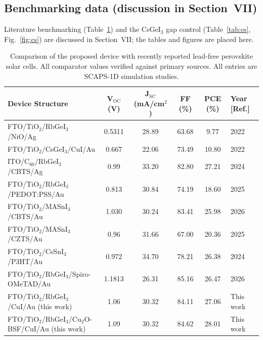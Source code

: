\documentclass[aip,amsmath,amssymb,preprint]{revtex4-2}
\begin{document}
\subsection{Benchmarking data (discussion in Section~VII)}
Literature benchmarking (Table~\ref{tab:bench}) and the CsGeI$_{3}$ gap control (Table~\ref{tab:cs}, Fig.~\ref{fig:cs}) are discussed in Section~VII; the tables and figures are placed here.

\begin{table}[htbp]
\label{tab:bench}
\centering
{\scriptsize\setlength{\tabcolsep}{2pt}
\begin{tabular*}{\textwidth}{@{\extracolsep{\fill}}lccccl}
\hline
Device Structure & V$_{\mathrm{OC}}$ (V) & J$_{\mathrm{SC}}$ (mA/cm$^{2}$) & FF (\%) & PCE (\%) & Year [Ref.]
\\\hline
FTO/\allowbreak{}TiO$_{2}$/RbGeI$_{3}$/NiO/\allowbreak{}Ag & 0.5311 & 28.89 & 63.68 & 9.77 & 2022 \cite{r14}\\
FTO/\allowbreak{}TiO$_{2}$/CsGeI$_{3}$/CuI/\allowbreak{}Au & 0.667 & 22.06 & 73.49 & 10.80 & 2022 \cite{r24}\\
ITO/\allowbreak{}C$_{60}$/RbGeI$_{3}$/CBTS/\allowbreak{}Ag & 0.99 & 33.20 & 82.80 & 27.21 & 2024 \cite{r22}\\
FTO/\allowbreak{}TiO$_{2}$/RbGeI$_{3}$/PEDOT:PSS/\allowbreak{}Au & 0.813 & 30.84 & 74.19 & 18.60 & 2025 \cite{r39}\\
FTO/\allowbreak{}TiO$_{2}$/MASnI$_{3}$/CBTS/\allowbreak{}Au & 1.030 & 30.24 & 83.41 & 25.98 & 2026 \cite{r41}\\
FTO/\allowbreak{}TiO$_{2}$/MASnI$_{3}$/CZTS/Au & 0.96 & 31.66 & 67.00 & 20.36 & 2025 \cite{r42}\\
FTO/\allowbreak{}TiO$_{2}$/CsSnI$_{3}$/P3HT/Au & 0.972 & 34.70 & 78.21 & 26.38 & 2024 \cite{r40}\\
FTO/\allowbreak{}TiO$_{2}$/RbGeI$_{3}$/Spiro-OMeTAD/\allowbreak{}Au & 1.1813 & 26.31 & 85.16 & 26.47 & 2026 \cite{r23}\\
FTO/\allowbreak{}TiO$_{2}$/RbGeI$_{3}$/CuI/\allowbreak{}Au (this work) & 1.06 & 30.32 & 84.11 & 27.06 & This work\\
FTO/\allowbreak{}TiO$_{2}$/RbGeI$_{3}$/Cu$_{2}$O-BSF/CuI/\allowbreak{}Au (this work) & 1.09 & 30.32 & 84.62 & 28.01 & This work\\
\hline
\end{tabular*}
}
\caption{Comparison of the proposed device with recently reported lead-free perovskite solar cells. All comparator values verified against primary sources. All entries are SCAPS-1D simulation studies.}
\end{table}
\end{document}
